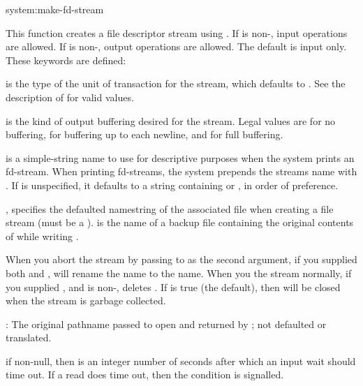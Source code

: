 \begin{defun}{system:}{make-fd-stream}{%
        }
  
  This function creates a file descriptor stream using
  .  If  is non-\nil, input operations are
  allowed.  If  is non-\nil, output operations are
  allowed.  The default is input only.  These keywords are defined:
  \begin{Lentry}
  \item[\kwd{element-type}] is the type of the unit of transaction for
    the stream, which defaults to .  See the \clisp{}
    description of  for valid values.
  
  \item[\kwd{buffering}] is the kind of output buffering desired for
    the stream.  Legal values are  for no buffering,
     for buffering up to each newline, and  for
    full buffering.
  
  \item[\kwd{name}] is a simple-string name to use for descriptive
    purposes when the system prints an fd-stream.  When printing
    fd-streams, the system prepends the streams name with .  If  is unspecified, it defaults to a string
    containing  or , in order of preference.
  
  \item[\kwd{file}, \kwd{original}]  specifies the defaulted
    namestring of the associated file when creating a file stream
    (must be a ).  is the
     name of a backup file containing the original
    contents of  while writing .
  
    When you abort the stream by passing \true{} to  as
    the second argument, if you supplied both  and
    ,  will rename the  name
    to the  name.  When you  the stream
    normally, if you supplied , and
     is non-\nil,  deletes
    .  If  is true (the default), then
     will be closed when the stream is garbage
    collected.
  
  \item[\kwd{pathname}]: The original pathname passed to open and
    returned by ; not defaulted or translated.
  
  \item[\kwd{timeout}] if non-null, then  is an integer
    number of seconds after which an input wait should time out.  If a
    read does time out, then the  condition is
    signalled.
  \end{Lentry}
\end{defun}

